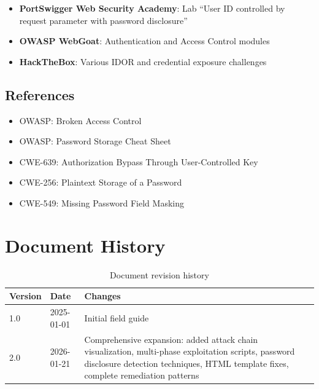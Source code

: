 \documentclass[11pt,letterpaper]{article}
\begin{document}
\begin{itemize}
  \item \textbf{PortSwigger Web Security Academy}: Lab ``User ID controlled by request parameter with password disclosure''
  \item \textbf{OWASP WebGoat}: Authentication and Access Control modules
  \item \textbf{HackTheBox}: Various IDOR and credential exposure challenges
\end{itemize}

\subsection{References}

\begin{itemize}
  \item OWASP: Broken Access Control
  \item OWASP: Password Storage Cheat Sheet
  \item CWE-639: Authorization Bypass Through User-Controlled Key
  \item CWE-256: Plaintext Storage of a Password
  \item CWE-549: Missing Password Field Masking
\end{itemize}

\section{Document History}

\begin{table}[h]
\centering
\begin{tabular}{@{}llp{8cm}@{}}
\toprule
\textbf{Version} & \textbf{Date} & \textbf{Changes} \\
\midrule
1.0 & 2025-01-01 & Initial field guide \\
2.0 & 2026-01-21 & Comprehensive expansion: added attack chain visualization, multi-phase exploitation scripts, password disclosure detection techniques, HTML template fixes, complete remediation patterns \\
\bottomrule
\end{tabular}
\caption{Document revision history}
\end{table}
\end{document}
